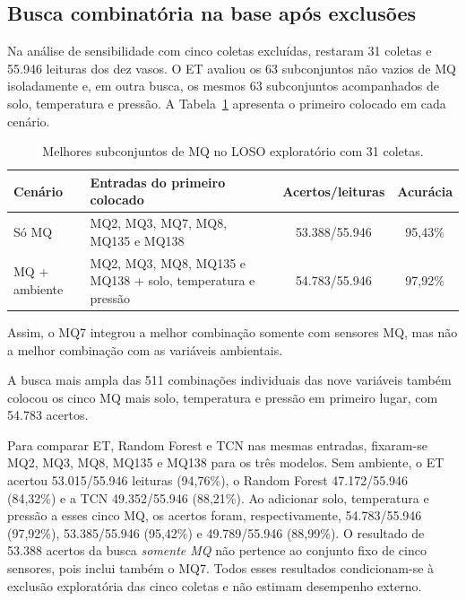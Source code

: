 \subsection{Busca combinatória na base após exclusões}
\label{subsec:resultados_busca_combinatoria_filtrada}

Na análise de sensibilidade com cinco coletas excluídas, restaram 31
coletas e 55.946 leituras dos dez vasos. O ET avaliou os 63 subconjuntos
não vazios de MQ isoladamente e, em outra busca, os mesmos 63 subconjuntos
acompanhados de solo, temperatura e pressão. A
Tabela~\ref{tab:busca_mq_filtrada} apresenta o primeiro colocado em cada
cenário.
\begin{table}[H]
    \centering
    \footnotesize
    \caption{Melhores subconjuntos de MQ no LOSO exploratório com 31 coletas.}
    \label{tab:busca_mq_filtrada}
    \begin{tabular}{p{}p{}cc}
        \hline
        Cenário & Entradas do primeiro colocado & Acertos/leituras & Acurácia \\
        \hline
        Só MQ & MQ2, MQ3, MQ7, MQ8, MQ135 e MQ138 & 53.388/55.946 & 95,43\% \\
        MQ + ambiente & MQ2, MQ3, MQ8, MQ135 e MQ138 + solo, temperatura e pressão & 54.783/55.946 & 97,92\% \\
        \hline
    \end{tabular}
\end{table}

Assim, o MQ7 integrou a melhor combinação somente com sensores MQ,
mas não a melhor combinação com as variáveis ambientais.

A busca mais ampla das 511 combinações individuais das nove variáveis
também colocou os cinco MQ mais solo, temperatura e pressão em primeiro
lugar, com 54.783 acertos.

Para comparar ET, Random Forest e TCN nas mesmas entradas, fixaram-se
MQ2, MQ3, MQ8, MQ135 e MQ138 para os três modelos. Sem ambiente, o ET
acertou 53.015/55.946 leituras (94,76\%), o Random Forest
47.172/55.946 (84,32\%) e a TCN 49.352/55.946 (88,21\%). Ao adicionar
solo, temperatura e pressão a esses cinco MQ, os acertos foram,
respectivamente, 54.783/55.946 (97,92\%), 53.385/55.946 (95,42\%) e
49.789/55.946 (88,99\%). O resultado de 53.388 acertos da busca
\emph{somente MQ} não pertence ao conjunto fixo de cinco sensores, pois
inclui também o MQ7. Todos esses resultados condicionam-se à exclusão
exploratória das cinco coletas e não estimam desempenho externo.

